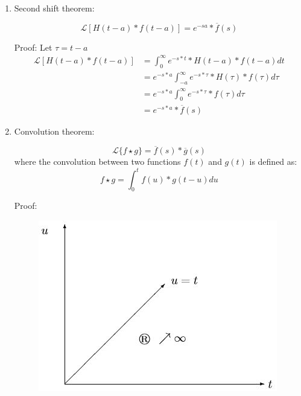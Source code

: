 \documentclass[10pt,a4paper]{article}
\begin{document}
\begin{enumerate}
     \item Second shift theorem:
     \begin{tcolorbox}[breakable,colback=white,colframe=black,width=\dimexpr\textwidth+12mm\relax,enlarge left by=-6mm]
        \begin{equation*} 
        \mathcal{L}[H(t-a)*f(t-a)] = e^{-sa}*\overline{f}(s)
        \end{equation*}
     \end{tcolorbox}
     Proof: Let $\tau = t-a$
     \begin{equation*} 
        \begin{aligned}
            \mathcal{L}[H(t-a)*f(t-a)] &= \int_0^{\infty}e^{-s*t}*H(t-a)*f(t-a) dt \\
            &= e^{-s*a} \int_{-a}^{\infty}e^{-s*\tau}*H(\tau)*f(\tau) d\tau \\
            &= e^{-s*a} \int_{0}^{\infty}e^{-s*\tau}*f(\tau) d\tau \\ 
            &= e^{-s*a}*\overline{f}(s)  
        \end{aligned}
     \end{equation*}
     \pagebreak
     \item Convolution theorem:
     \begin{tcolorbox}[breakable,colback=white,colframe=black,width=\dimexpr\textwidth+12mm\relax,enlarge left by=-6mm]
        \begin{equation*} 
        \mathcal{L}\{f\star g\} = \overline{f}(s)*\overline{g}(s)
        \end{equation*}
        where the convolution between two functions $f(t)$ and $g(t)$ is defined as:
        \begin{equation*} 
            f\star g = \int_0^tf(u)*g(t-u) du
        \end{equation*}
     \end{tcolorbox}
     Proof: 
     \begin{figure} [h!]
         \centering
         \includegraphics[scale=0.8]{Convolution.JPG}

\end{figure}
\end{enumerate}
\end{document}
